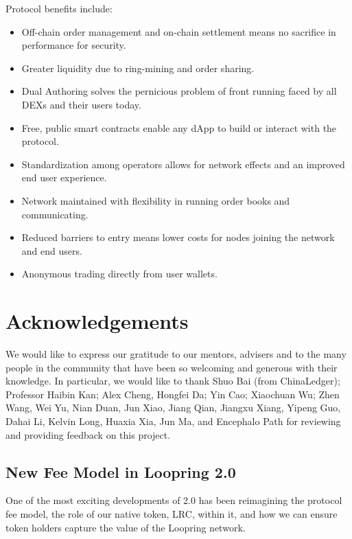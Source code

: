 \documentclass[UTF8,nofonts]{article}
\begin{document}
\begin{multicols}{2}
Protocol benefits include:

\begin{itemize}
	\item Off-chain order management and on-chain settlement means no sacrifice in performance for security.
	\item Greater liquidity due to ring-mining and order sharing.
	\item Dual Authoring solves the pernicious problem of front running faced by all DEXs and their users today.
	\item Free, public smart contracts enable any dApp to build or interact with the protocol.
	\item Standardization among operators allows for network effects and an improved end user experience.
	\item Network maintained with flexibility in running order books and communicating.
	\item Reduced barriers to entry means lower costs for nodes joining the network and end users.
	\item Anonymous trading directly from user wallets.
\end{itemize}

\section{Acknowledgements}
We would like to express our gratitude to our mentors, advisers and to the many people in the community that have been so welcoming and generous with their knowledge. In particular, we would like to thank Shuo Bai (from ChinaLedger); Professor Haibin Kan; Alex Cheng, Hongfei Da; Yin Cao; Xiaochuan Wu; Zhen Wang, Wei Yu, Nian Duan, Jun Xiao, Jiang Qian, Jiangxu Xiang, Yipeng Guo, Dahai Li, Kelvin Long, Huaxia Xia, Jun Ma, and Encephalo Path for reviewing and providing feedback on this project. 




\begin{appendices}

\section{New Fee Model in Loopring 2.0}

One of the most exciting developments of 2.0 has been reimagining the protocol fee model, the role of our native token, LRC, within it, and how we can ensure token holders capture the value of the Loopring network.


\end{appendices}
\end{multicols}
\end{document}

